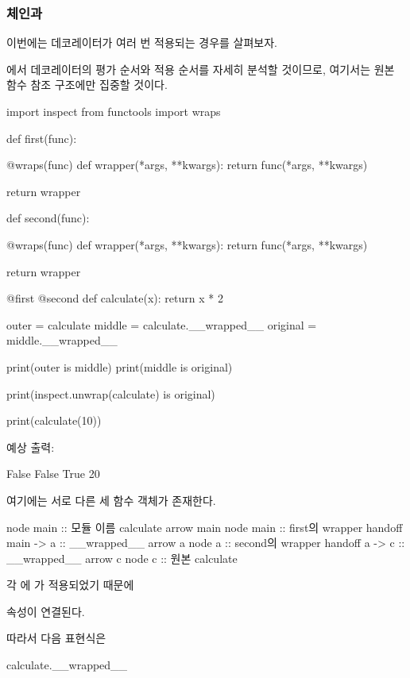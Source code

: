 \subsubsection{ 체인과 }

이번에는 데코레이터가 여러 번 적용되는 경우를 살펴보자.

에서 데코레이터의 평가 순서와 적용 순서를 자세히 분석할 것이므로, 여기서는 원본 함수 참조 구조에만 집중할 것이다.

\begin{dhkcode}
import inspect
from functools import wraps

def first(func):

    @wraps(func)
    def wrapper(*args, **kwargs):
        return func(*args, **kwargs)

    return wrapper


def second(func):

    @wraps(func)
    def wrapper(*args, **kwargs):
        return func(*args, **kwargs)

    return wrapper


@first
@second
def calculate(x):
    return x * 2


outer = calculate
middle = calculate.__wrapped__
original = middle.__wrapped__

print(outer is middle)
print(middle is original)

print(inspect.unwrap(calculate) is original)

print(calculate(10))
\end{dhkcode}

예상 출력:

\begin{dhkzsh}
False
False
True
20
\end{dhkzsh}

여기에는 서로 다른 세 함수 객체가 존재한다.

\begin{dhkbranch}[in=8]
node main :: 모듈 이름 calculate
arrow main
node main :: first의 wrapper
handoff main -> a :: __wrapped__
arrow a
node a :: second의 wrapper
handoff a -> c :: __wrapped__
arrow c
node c :: 원본 calculate
\end{dhkbranch}

각 에 가 적용되었기 때문에

 속성이 연결된다.

따라서 다음 표현식은

\begin{dhkcode}
calculate.__wrapped__
\end{dhkcode}

